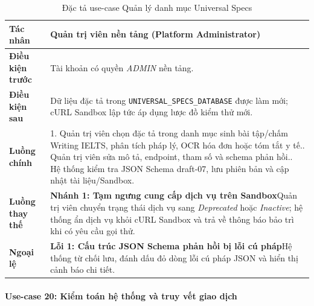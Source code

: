 \begingroup
\small
\begin{longtable}{|p{3.2cm}|p{\dimexpr\linewidth-3.2cm-4\tabcolsep-3\arrayrulewidth\relax}|}
\caption{Đặc tả use-case Quản lý danh mục Universal Specs}
\label{aihub:tab:uc_manage_universal_specs}\\
\hline
\textbf{Tác nhân} & Quản trị viên nền tảng (Platform Administrator) \\ \hline
\textbf{Điều kiện trước} & Tài khoản có quyền \textit{ADMIN} nền tảng. \\ \hline
\textbf{Điều kiện sau} & Dữ liệu đặc tả trong \texttt{UNIVERSAL\_SPECS\_DATABASE} được làm mới; cURL Sandbox lập tức áp dụng lược đồ kiểm thử mới. \\ \hline
\textbf{Luồng chính} & 1. Quản trị viên chọn đặc tả trong danh mục sinh bài tập/chấm Writing IELTS, phân tích pháp lý, OCR hóa đơn hoặc tóm tắt y tế.\newline 2. Quản trị viên sửa mô tả, endpoint, tham số và schema phản hồi.\newline 3. Hệ thống kiểm tra JSON Schema draft-07, lưu phiên bản và cập nhật tài liệu/Sandbox. \\ \hline
\textbf{Luồng thay thế} &
\textbf{Nhánh 1: Tạm ngưng cung cấp dịch vụ trên Sandbox}\newline Quản trị viên chuyển trạng thái dịch vụ sang \textit{Deprecated} hoặc \textit{Inactive}; hệ thống ẩn dịch vụ khỏi cURL Sandbox và trả về thông báo bảo trì khi có yêu cầu gọi thử. \\ \hline
\textbf{Ngoại lệ} &
\textbf{Lỗi 1: Cấu trúc JSON Schema phản hồi bị lỗi cú pháp}\newline Hệ thống từ chối lưu, đánh dấu đỏ dòng lỗi cú pháp JSON và hiển thị cảnh báo chi tiết. \\ \hline
\end{longtable}
\endgroup

\paragraph{Use-case 20: Kiểm toán hệ thống và truy vết giao dịch}

